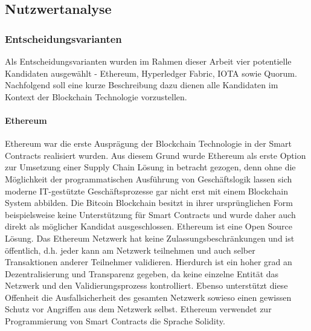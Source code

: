 \subsection{Nutzwertanalyse}
\subsubsection{Entscheidungsvarianten}
Als Entscheidungsvarianten wurden im Rahmen dieser Arbeit vier potentielle Kandidaten ausgewählt - Ethereum, Hyperledger Fabric, IOTA sowie Quorum. Nachfolgend soll eine kurze Beschreibung dazu dienen alle Kandidaten im Kontext der Blockchain Technologie vorzustellen.

\paragraph{Ethereum}
Ethereum war die erste Ausprägung der Blockchain Technologie in der Smart Contracts realisiert wurden. Aus diesem Grund wurde Ethereum als erste Option zur Umsetzung einer Supply Chain Lösung in betracht gezogen, denn ohne die Möglichkeit der programmatischen Ausführung von Geschäftslogik lassen sich moderne IT-gestützte Geschäftsprozesse gar nicht erst mit einem Blockchain System abbilden. Die Bitcoin Blockchain besitzt in ihrer ursprünglichen Form beispielsweise keine Unterstützung für Smart Contracts und wurde daher auch direkt als möglicher Kandidat ausgeschlossen. Ethereum ist eine Open Source Lösung. Das Ethereum Netzwerk hat keine Zulassungsbeschränkungen und ist öffentlich, d.h. jeder kann am Netzwerk teilnehmen und auch selber Transaktionen anderer Teilnehmer validieren. Hierdurch ist ein hoher grad an Dezentralisierung und Transparenz gegeben, da keine einzelne Entität das Netzwerk und den Validierungsprozess kontrolliert. Ebenso unterstützt diese Offenheit die Ausfallsicherheit des gesamten Netzwerk sowieso einen gewissen Schutz vor Angriffen aus dem Netzwerk selbst. Ethereum verwendet zur Programmierung von Smart Contracts die Sprache Solidity.

